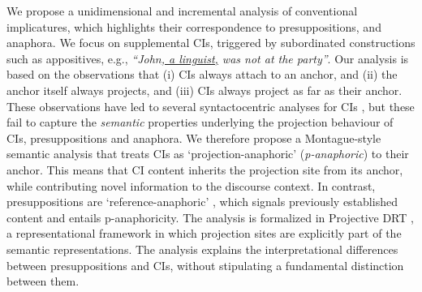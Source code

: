 \documentclass[letterpaper,11pt]{article}
\begin{document}
We propose a unidimensional and incremental analysis of conventional
implicatures, which highlights their correspondence to presuppositions, and
anaphora.  We focus on supplemental CIs, triggered by subordinated
constructions such as appositives, e.g., \emph{``John\underline{,
a linguist,} was not at the party''}. Our analysis is based on the
observations that (i) CIs always attach to an anchor, and (ii) the anchor
itself always projects, and (iii) CIs always project as far as their anchor.
These observations have led to several syntactocentric analyses for CIs
\cite[e.g.,][]{nouwen2007appositives-short,schlenker2013supplements,nouwen2014note},
but these fail to capture the \emph{semantic} properties underlying the
projection behaviour of CIs, presuppositions and anaphora. We therefore
propose a Montague-style semantic analysis that treats CIs as
`projection-anaphoric' (\emph{p-anaphoric}) to their anchor. This means that
CI content inherits the projection site from its anchor, while contributing
novel information to the discourse context. In contrast, presuppositions are
`reference-anaphoric' \citep[cf.][]{sandt1992presupposition-short}, which
signals previously established content and entails p-anaphoricity. The
analysis is formalized in Projective DRT \cite{venhuizen2013iwcs-short},
a representational framework in which projection sites are explicitly part
of the semantic representations.  The analysis explains the interpretational
differences between presuppositions and CIs, without stipulating
a fundamental distinction between them.

\end{document}
